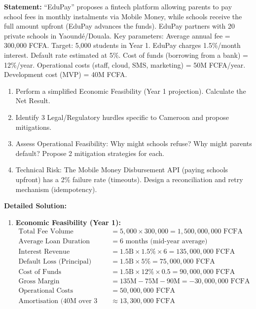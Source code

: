 \documentclass[11pt]{article}
\begin{document}
\begin{exoresolu}
\textbf{Statement:} ``EduPay'' proposes a fintech platform allowing parents to pay school fees in monthly instalments via Mobile Money, while schools receive the full amount upfront (EduPay advances the funds). EduPay partners with 20 private schools in Yaoundé/Douala.
Key parameters: Average annual fee = 300,000 FCFA. Target: 5,000 students in Year 1. EduPay charges 1.5\%/month interest. Default rate estimated at 5\%. Cost of funds (borrowing from a bank) = 12\%/year. Operational costs (staff, cloud, SMS, marketing) = 50M FCFA/year. Development cost (MVP) = 40M FCFA.
\begin{enumerate}
    \item Perform a simplified Economic Feasibility (Year 1 projection). Calculate the Net Result.
    \item Identify 3 Legal/Regulatory hurdles specific to Cameroon and propose mitigations.
    \item Assess Operational Feasibility: Why might schools refuse? Why might parents default? Propose 2 mitigation strategies for each.
    \item Technical Risk: The Mobile Money Disbursement API (paying schools upfront) has a 2\% failure rate (timeouts). Design a reconciliation and retry mechanism (idempotency).
\end{enumerate}
\tcblower
\textbf{Detailed Solution:}
\begin{enumerate}
    \item \textbf{Economic Feasibility (Year 1):}
    \begin{align*}
    \text{Total Fee Volume} &= 5,000 \times 300,000 = 1,500,000,000 \text{ FCFA} \\
    \text{Average Loan Duration} &= 6 \text{ months (mid-year average)} \\
    \text{Interest Revenue} &= 1.5\text{B} \times 1.5\% \times 6 = 135,000,000 \text{ FCFA} \\
    \text{Default Loss (Principal)} &= 1.5\text{B} \times 5\% = 75,000,000 \text{ FCFA} \\
    \text{Cost of Funds} &= 1.5\text{B} \times 12\% \times 0.5 = 90,000,000 \text{ FCFA} \\
    \text{Gross Margin} &= 135\text{M} - 75\text{M} - 90\text{M} = -30,000,000 \text{ FCFA} \\
    \text{Operational Costs} &= 50,000,000 \text{ FCFA} \\
    \text{Amortisation (40M over 3 years)} &\approx 13,300,000 \text{ FCFA} \\

\end{align*}
\end{enumerate}
\end{exoresolu}
\end{document}
